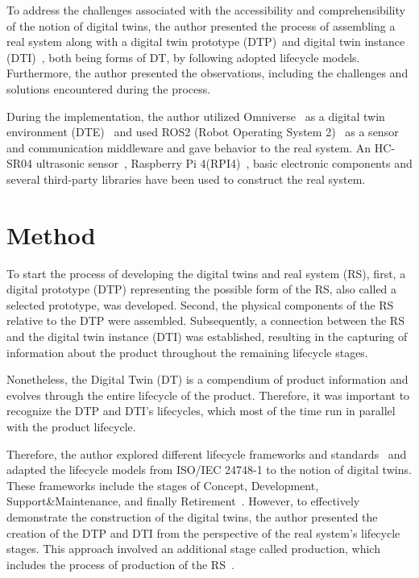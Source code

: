 \documentclass[conference]{IEEEtran}
\begin{document}
    To address the challenges associated with the accessibility and comprehensibility of the notion of digital twins, the author presented the
    process of assembling a real system along with a digital twin prototype (DTP)~\cite{Originsofdigitaltwinconcept}and digital twin instance (DTI)~\cite{Originsofdigitaltwinconcept}, both being forms of DT, 
    by following adopted lifecycle models. Furthermore, the author presented the observations, including the challenges and solutions encountered during the process.

    During the implementation, the author utilized Omniverse~\cite{Omniverse} as a digital twin environment (DTE)~\cite{Originsofdigitaltwinconcept} and used ROS2 (Robot Operating System 2)~\cite{ROS2}
    as a sensor and communication middleware and gave behavior to the real system. An HC-SR04 ultrasonic sensor~\cite{HCSR04}, Raspberry Pi 4(RPI4)~\cite{RPI4}, 
    basic electronic components and several third-party libraries have been used to construct the real system. 

    \section{Method}\label{section:Method}
    To start the process of developing the digital twins and real system (RS), first, a digital prototype (DTP) 
    representing the possible form of the RS, also called a selected prototype, was developed. 
    Second, the physical components of the RS relative to the DTP were assembled. 
    Subsequently, a connection between the RS and the digital twin instance (DTI) was established, 
    resulting in the capturing of information about the product throughout the remaining lifecycle stages.

    Nonetheless, the Digital Twin (DT) is a compendium of product information and evolves through the entire lifecycle of the product. 
    Therefore, it was important to recognize the DTP and DTI's lifecycles, which most of the time run in parallel with the product lifecycle.

    Therefore, the author explored different lifecycle frameworks and standards~\cite{ISO/IEC/IEEE12207,ISO/IEC/IEEE15288,ISO/IEC/IEEE24748-1:2018} and adapted the lifecycle models 
    from ISO/IEC 24748-1 to the notion of digital twins. 
    These frameworks include the stages of  Concept, Development, Support\&Maintenance, and finally Retirement~\cite{ISO/IEC/IEEE24748-1:2018}. 
    However, to effectively demonstrate the construction of the digital twins, the author presented the creation of the DTP and DTI from the perspective of the real system's lifecycle stages. 
    This approach involved an additional stage called production, which includes the process of production of the RS~\cite{ISO/IEC/IEEE24748-1:2018}.
\end{document}
